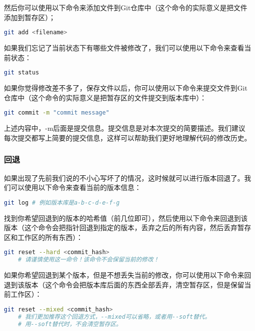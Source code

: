 \documentclass[../main.tex]{subfiles}
\begin{document}
然后你可以使用以下命令来添加文件到Git仓库中（这个命令的实际意义是把文件添加到暂存区）；

\begin{lstlisting}[language=bash]
    git add <filename>
\end{lstlisting}

如果我们忘记了当前状态下有哪些文件被修改了，我们可以使用以下命令来查看当前状态：
\begin{lstlisting}[language=bash]
    git status
\end{lstlisting}

如果你觉得修改差不多了，保存文件以后，你可以使用以下命令来提交文件到Git仓库中（这个命令的实际意义是把暂存区的文件提交到版本库中）：

\begin{lstlisting}[language=bash]
    git commit -m "commit message"
\end{lstlisting}

上述内容中，-m后面是提交信息。提交信息是对本次提交的简要描述。我们建议每次提交都写上简要的提交信息，这样可以帮助我们更好地理解代码的修改历史。

\subsubsection{回退}

如果出现了先前我们说的不小心写坏了的情况，这时候就可以进行版本回退了。我们可以使用以下命令来查看当前的版本信息：

\begin{lstlisting}[language=bash]
    git log # 例如版本库是a-b-c-d-e-f-g
\end{lstlisting}

找到你希望回退到的版本的哈希值（前几位即可），然后使用以下命令来回退到该版本（这个命令会把指针回退到指定的版本，丢弃之后的所有内容，然后丢弃暂存区和工作区的所有东西）：

\begin{lstlisting}[language=bash]
    git reset --hard <commit_hash>
    # 请谨慎使用这一命令！该命令不会保留当前的修改！
\end{lstlisting}

如果你希望回退到某个版本，但是不想丢失当前的修改，你可以使用以下命令来回退到该版本（这个命令会把版本库后面的东西全部丢弃，清空暂存区，但是保留当前工作区）：
\begin{lstlisting}[language=bash]
    git reset --mixed <commit_hash>
    # 我们更加推荐这个回退方式，--mixed可以省略，或者用--soft替代。
    # 用--soft替代时，不会清空暂存区。
\end{lstlisting}
\end{document}
